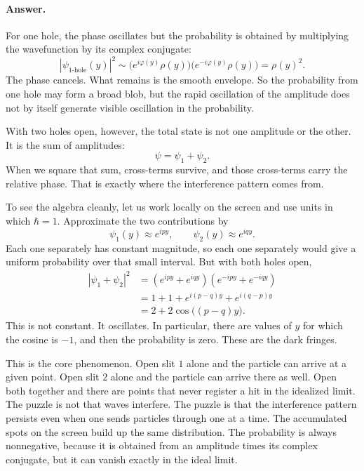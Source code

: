 \paragraph{Answer.} For one hole, the phase oscillates but the probability is obtained by multiplying the wavefunction by its complex conjugate:
\begin{equation}
|\psi_{\text{1-hole}}(y)|^2
  \sim \bigl(e^{i\varphi(y)}\rho(y)\bigr)\bigl(e^{-i\varphi(y)}\rho(y)\bigr)
  = \rho(y)^2.
\end{equation}
The phase cancels. What remains is the smooth envelope. So the probability from one hole may form a broad blob, but the rapid oscillation of the amplitude does not by itself generate visible oscillation in the probability.

With two holes open, however, the total state is not one amplitude or the other. It is the sum of amplitudes:
\[
\psi=\psi_1+\psi_2.
\]
When we square that sum, cross-terms survive, and those cross-terms carry the relative phase. That is exactly where the interference pattern comes from.

To see the algebra cleanly, let us work locally on the screen and use units in which \(\hbar=1\). Approximate the two contributions by
\begin{equation}
\psi_1(y)\approx e^{ipy},
\qquad
\psi_2(y)\approx e^{iqy}.
\end{equation}
Each one separately has constant magnitude, so each one separately would give a uniform probability over that small interval. But with both holes open,
\begin{align}
|\psi_1+\psi_2|^2
  &= (e^{ipy}+e^{iqy})(e^{-ipy}+e^{-iqy}) \\
  &= 1+1+e^{i(p-q)y}+e^{i(q-p)y} \\
  &= 2+2\cos\bigl((p-q)y\bigr).
\end{align}
This is not constant. It oscillates. In particular, there are values of \(y\) for which the cosine is \(-1\), and then the probability is zero. These are the dark fringes.

This is the core phenomenon. Open slit \(1\) alone and the particle can arrive at a given point. Open slit \(2\) alone and the particle can arrive there as well. Open both together and there are points that never register a hit in the idealized limit. The puzzle is not that waves interfere. The puzzle is that the interference pattern persists even when one sends particles through one at a time. The accumulated spots on the screen build up the same distribution. The probability is always nonnegative, because it is obtained from an amplitude times its complex conjugate, but it can vanish exactly in the ideal limit.

